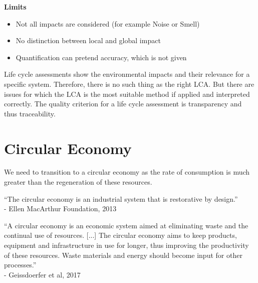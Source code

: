 \documentclass[11pt]{article}
\theoremstyle{definition}
\begin{document}
\vspace{1em}
\noindent
\textbf{Limits}
\begin{itemize}
	\item Not all impacts are considered (for example Noise or Smell)
	\item No distinction between local and global impact
	\item Quantification can pretend accuracy, which is not given
\end{itemize}

Life cycle assessments show the environmental impacts and their relevance for a specific system. Therefore, there is no such thing as the right LCA. But there are issues for which the LCA is the most suitable method if applied and interpreted correctly. The quality criterion for a life cycle assessment is transparency and thus traceability.

\section{Circular Economy}
We need to transition to a circular economy as the rate of consumption is much greater than the regeneration of these resources.
\begin{definition}
	\textquotedblleft The circular economy is an industrial system that is restorative by design.\textquotedblright\\
	\hspace*{1em} - Ellen MacArthur Foundation, 2013
\end{definition}

\begin{definition}
	\textquotedblleft A circular economy is an economic system aimed at eliminating waste and the continual use of resources. [...] The circular economy aims to keep products, equipment and infrastructure in use for longer, thus improving the productivity of these resources. Waste materials and energy should become input for other processes.\textquotedblright\\
	\hspace*{1em} - Geissdoerfer et al, 2017
\end{definition}
\end{document}

